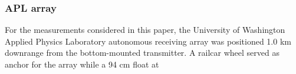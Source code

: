 \subsubsection{APL array}
For the measurements considered in this paper, the University of
Washington Applied Physics Laboratory autonomous receiving array was
positioned 1.0 km downrange from the bottom-mounted transmitter. A
railcar wheel served as anchor for the array while a 94 cm float at
